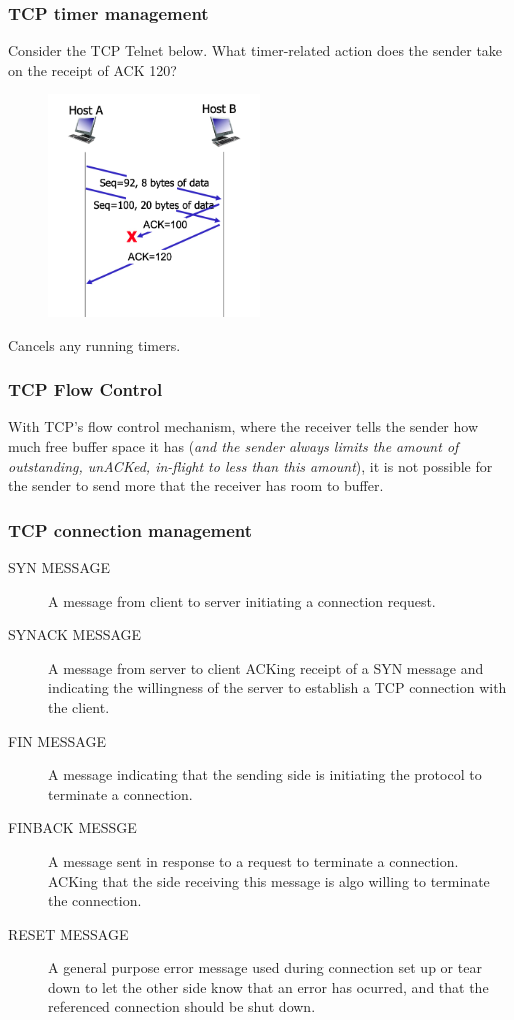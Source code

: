    \subsubsection*{TCP timer management}
    \noindent Consider the TCP Telnet below. What timer-related action does the sender take on the receipt of ACK 120?
    \begin{figure}[H]
        \centering
        \includegraphics[width=0.5\textwidth]{img/3.5.6.jpg}
    \end{figure}
    \noindent Cancels any running timers.

    \subsubsection*{TCP Flow Control}
    \noindent With TCP's flow control mechanism, where the receiver tells the sender how much free buffer space it has (\textit{and the sender always limits the amount
    of outstanding, unACKed, in-flight to less than this amount}), it is not possible for the sender to send more that the receiver has room to buffer.

    \subsubsection*{TCP connection management}
    \begin{description}
        \item[SYN MESSAGE] A message from client to server initiating a connection request.
        \item[SYNACK MESSAGE] A message from server to client ACKing receipt of a SYN message and indicating the willingness of the server to establish a TCP connection with the client.
        \item[FIN MESSAGE] A message indicating that the sending side is initiating the protocol to terminate a connection.
        \item[FINBACK MESSGE] A message sent in response to a request to terminate a connection. ACKing that the side receiving this message is algo willing to terminate the connection.
        \item[RESET MESSAGE] A general purpose error message used during connection set up or tear down to let the other side know that an error has ocurred, and that the referenced connection
        should be shut down.     
    \end{description}

